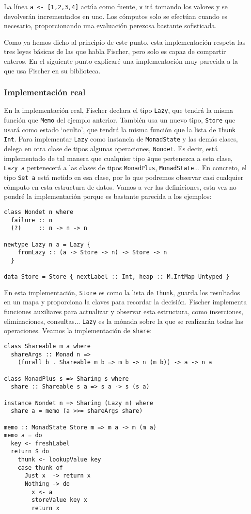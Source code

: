 \documentclass[class=article, crop=false]{standalone}
\begin{document}
La línea \verb`a <- [1,2,3,4]` actúa como fuente, \verb`v` irá tomando los valores y se
devolverán incrementados en uno. Los cómputos solo se efectúan cuando es necesario,
proporcionando una evaluación perezosa bastante sofisticada.

Como ya hemos dicho al principio de este punto, esta implementación respeta las tres leyes
básicas de las que habla Fischer, pero solo es capaz de compartir enteros. En el siguiente
punto explicaré una implementación muy parecida a la que usa Fischer en su biblioteca.

\subsubsection{Implementación real}
En la implementación real, Fischer declara el tipo \verb`Lazy`, que tendrá la misma función
que \verb`Memo` del ejemplo anterior. También usa un nuevo tipo, \verb`Store` que usará como
estado `oculto', que tendrá la misma función que la lista de \verb`Thunk Int`. Para
implementar \verb`Lazy` como instancia de \verb`MonadState` y las demás clases, delega en
otra clase de tipos algunas operaciones, \verb`Nondet`. Es decir, está implementado de tal
manera que cualquier tipo \verb`a`que pertenezca a esta clase, \verb`Lazy a` pertenecerá a
las clases de tipos \verb`MonadPlus`, \verb`MonadState`... En concreto, el tipo \verb`Set a`
está metido en esa clase, por lo que podremos observar casi cualquier cómputo en esta
estructura de datos. Vamos a ver las definiciones, esta vez no pondré la implementación
porque es bastante parecida a los ejemplos:

\begin{verbatim}
class Nondet n where
  failure :: n
  (?)     :: n -> n -> n

newtype Lazy n a = Lazy {
    fromLazy :: (a -> Store -> n) -> Store -> n
  }

data Store = Store { nextLabel :: Int, heap :: M.IntMap Untyped }
\end{verbatim}

En esta implementación, \verb`Store` es como la lista de \verb`Thunk`, guarda los resultados
en un mapa y proporciona la claves para recordar la decisión. Fischer implementa funciones
auxiliares para actualizar y observar esta estructura, como inserciones, eliminaciones,
consultas... \verb`Lazy` es la mónada sobre la que se realizarán todas las operaciones.
Veamos la implementación de \verb`share`:

\begin{verbatim}
class Shareable m a where
  shareArgs :: Monad n =>
    (forall b . Shareable m b => m b -> n (m b)) -> a -> n a

class MonadPlus s => Sharing s where
  share :: Shareable s a => s a -> s (s a)

instance Nondet n => Sharing (Lazy n) where
  share a = memo (a >>= shareArgs share)

memo :: MonadState Store m => m a -> m (m a)
memo a = do
  key <- freshLabel
  return $ do
    thunk <- lookupValue key
    case thunk of
      Just x  -> return x
      Nothing -> do
        x <- a
        storeValue key x
        return x
\end{verbatim}
\end{document}
